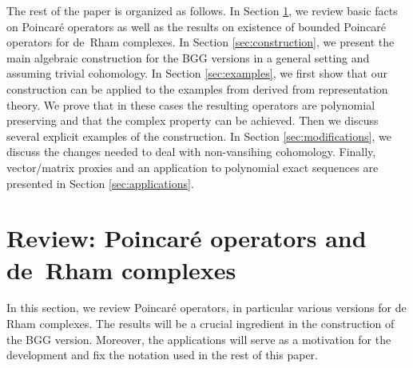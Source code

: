 \documentclass[11pt]{amsart}
\newcommand{\0}{\mathaccent23}
\begin{document}
The rest of the paper is organized as follows. In Section \ref{sec:de Rham}, we review basic facts on Poincar\'e operators as well as the results on existence of bounded Poincar\'e operators for de~Rham complexes. In Section \ref{sec:construction}, we present the main algebraic construction for the BGG versions in a general setting and assuming trivial cohomology. In Section \ref{sec:examples}, we first show that our construction can be applied to the examples from \cite{vcap2022bgg} derived from representation theory. We prove that in these cases the resulting operators are polynomial preserving and that the complex property can be achieved. Then we discuss several explicit examples of the construction.  In Section \ref{sec:modifications}, we discuss the changes needed to deal with non-vansihing cohomology. Finally, vector/matrix proxies and an application to polynomial exact sequences are presented in Section \ref{sec:applications}. 



\section{Review: Poincar\'e operators and de~Rham complexes}\label{sec:de Rham}

In this section, we review Poincar\'e operators, in particular various versions for de Rham complexes. The results will be a crucial ingredient in the construction of the BGG version. Moreover, the applications will serve as a motivation for the development and fix the notation used in the rest of this paper. 
\end{document}
